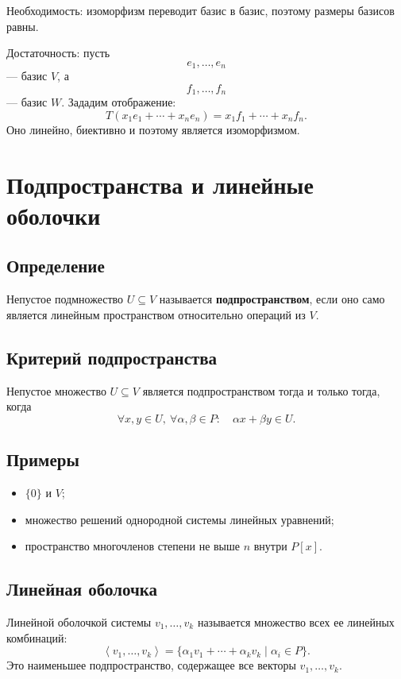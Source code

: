 \documentclass[12pt,a4paper]{article}
\newcommand{\Lin}[1]{\left\langle #1 \right\rangle}
\begin{document}
Необходимость: изоморфизм переводит базис в базис, поэтому размеры базисов равны.

Достаточность: пусть
\[
    e_1,\ldots,e_n
\]
--- базис $V$, а
\[
    f_1,\ldots,f_n
\]
--- базис $W$. Зададим отображение:
\[
    T(x_1e_1+\cdots+x_ne_n)=x_1f_1+\cdots+x_nf_n.
\]
Оно линейно, биективно и поэтому является изоморфизмом.

\section{Подпространства и линейные оболочки}

\subsection*{Определение}

Непустое подмножество $U\subseteq V$ называется \textbf{подпространством}, если оно само является линейным пространством относительно операций из $V$.

\subsection*{Критерий подпространства}

Непустое множество $U\subseteq V$ является подпространством тогда и только тогда, когда
\[
    \forall x,y\in U,\ \forall \alpha,\beta\in P:\quad \alpha x+\beta y\in U.
\]

\subsection*{Примеры}

\begin{itemize}
    \item $\{0\}$ и $V$;
    \item множество решений однородной системы линейных уравнений;
    \item пространство многочленов степени не выше $n$ внутри $P[x]$.
\end{itemize}

\subsection*{Линейная оболочка}

Линейной оболочкой системы $v_1,\ldots,v_k$ называется множество всех ее линейных комбинаций:
\[
    \Lin{v_1,\ldots,v_k}
    =
    \{\alpha_1v_1+\cdots+\alpha_kv_k\mid \alpha_i\in P\}.
\]
Это наименьшее подпространство, содержащее все векторы $v_1,\ldots,v_k$.
\end{document}
